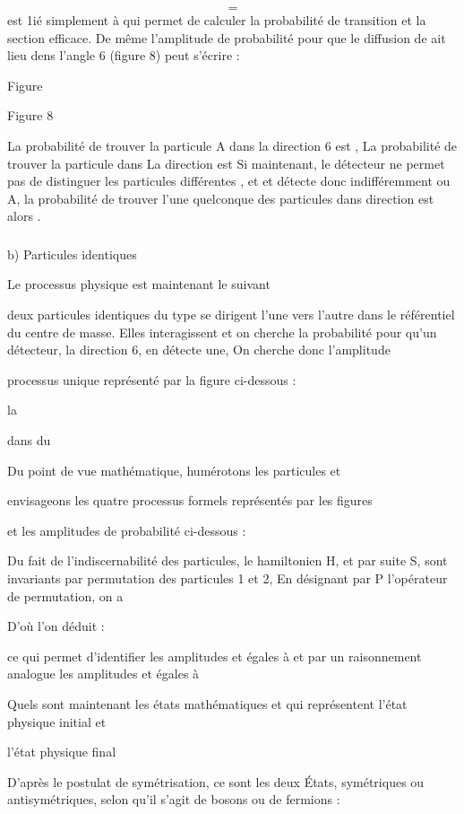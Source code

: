 \[
\tag{8}=
\]
 est 1ié simplement  à  qui permet de calculer la probabilité de transition et
 la section efficace.
De même l'amplitude de probabilité pour que le diffusion de
ait lieu dens l'angle 6 (figure 8) peut s'écrire :

Figure

Figure 8

La probabilité de trouver la particule A dans la
direction 6 est , La probabilité de trouver la particule  dans La direction  est
 Si maintenant,
le détecteur ne permet pas de distinguer les particules différentes , et  et
détecte donc indifféremment  ou A, la
probabilité de trouver l'une quelconque des particules dans
direction  est alors .
\subsubsection{}%
b) Particules identiques

Le processus physique est maintenant le suivant

deux particules identiques du type  se dirigent l'une vers
l'autre dans le référentiel du centre de masse. Elles interagissent et on cherche
la probabilité pour qu'un détecteur,
la direction 6, en détecte une, On cherche donc l'amplitude

processus unique représenté par la figure ci-dessous :

la

dans
du

 

Du point de vue mathématique, humérotons les particules et

envisageons les quatre processus formels représentés par les figures

et les amplitudes de probabilité ci-dessous :


Du fait de l'indiscernabilité des particules, le
hamiltonien H, et par suite S, sont invariants par permutation
des particules 1 et 2, En désignant par P l'opérateur de permutation, on a

D'où l'on déduit :

ce qui permet d'identifier les amplitudes  et  égales à
 et par un raisonnement analogue les amplitudes  et 
égales à 

Quels sont maintenant les états mathématiques 
et qui représentent l'état physique initial  et

l'état physique final 

D'après le postulat de symétrisation, ce sont les deux
États, symétriques ou antisymétriques, selon qu'il s'agit de bosons
ou de fermions :

